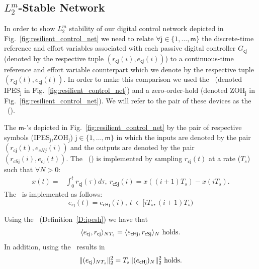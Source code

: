 \subsection{$L^m_2$-Stable Network}
\label{S:stability}
In order to show $L^m_2$ stability of our digital control network
depicted in Fig.~\ref{fig:resilient_control_net} we need to relate
$\forall \mathsf{j} \in \{1,\dots,\mathsf{m}\}$ the discrete-time reference and
effort variables associated with each passive digital controller $G_{\mathsf{cj}}$ (denoted by the respective tuple $(r_{\mathsf{cj}}(i),e_{\mathsf{cj}}(i))$) to a continuous-time reference and effort variable counterpart which we denote by the respective tuple $(r_{\mathsf{cj}}(t),e_{\mathsf{cj}}(t))$.  In order to make this comparison we used the \ipes\ (denoted \textsf{IPES}$_{\mathsf{j}}$ in Fig.~\ref{fig:resilient_control_net}) and a zero-order-hold (denoted \textsf{ZOH}$_{\mathsf{j}}$ in Fig.~\ref{fig:resilient_control_net}).  We will refer to the pair of these devices as the \ipesh\ (\IPESH).
\begin{definition}
\label{D:ipesh}\cite{kottenstette07:_stabl_digit_contr_networ_contin,kottenstette08:_passiv_based_desig_of_wirel}
The $\mathsf{m}$-\ipesh's depicted in Fig.~\ref{fig:resilient_control_net} by the pair of respective symbols (\textsf{IPES}$_{\mathsf{j}}$,\textsf{ZOH}$_{\mathsf{j}}$) $\mathsf{j} \in \{1,\dots,\mathsf{m}\}$ in which the inputs are denoted by the pair $(r_{\mathsf{cj}}(t),e_{cHj}(i))$ and the outputs are denoted by the pair $(r_{\mathsf{cSj}}(i),e_{\mathsf{cj}}(t))$.  The \ipes\ (\IPES) is implemented by sampling $r_{\mathsf{cj}}(t)$ at a rate ($T_s$) such that $\forall N > 0$:
\begin{align}
\label{E:ipes}
x(t) =& \int_0^t r_{\mathsf{cj}}(\tau) d \tau,\ r_{\mathsf{cSj}}(i)=
x((i+1)T_s) - x(iT_s).
\end{align}
The \ZOH\ is implemented as follows:
\begin{equation}
\label{E:zoh}
e_{\mathsf{cj}}(t) = e_{\mathsf{cHj}}(i),\ t\ \in [iT_s,(i+1)T_s)
\end{equation}
\end{definition}
\begin{corollary}
\label{C:ipesh}
Using the \IPESH\ (Definition~\ref{D:ipesh}) we have that 
\begin{equation}
\label{E:ipesh_eq}
\langle e_{\mathsf{cj}},r_{\mathsf{cj}} \rangle_{NT_s} = \langle e_{\mathsf{cHj}},r_{\mathsf{cSj}} \rangle_N\ \text{holds.}
\end{equation}
In addition, using the \ZOH\ results in 
\begin{equation}
\label{E:zoh_ineq}
\|(e_{\mathsf{cj}})_{NT_s}\|_{2}^2 = T_s\|(e_{\mathsf{cHj}})_{N}\|_{2}^2\ \text{holds.}
\end{equation}
\end{corollary}
